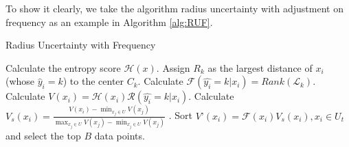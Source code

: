 To show it clearly, we take the algorithm radius uncertainty with adjustment on frequency as an example in Algorithm \ref{alg:RUF}.
\begin{algorithm}
\caption{Radius Uncertainty with Frequency}
\label{alg:RUF}
\begin{algorithmic}
\REPEAT 
\STATE Calculate the entropy score $\mathcal{H}(x)$.
\STATE Assign $R_k$ as the largest distance of $x_i$ (whose $\hat{y}_i = k$) to the center $C_k$.
\STATE Calculate $\mathcal{F}(\hat{y_i} = k|x_i) = Rank(\mathcal{L}_k)$.
\STATE Calculate $V(x_i) = {\mathcal{H}(x_i)}{\mathcal{R}(\hat{y_i}=k|x_i)}$.
\STATE  Calculate $V_s(x_i) = \frac{V(x_i)-\min_{x_j\in U}V(x_j)}{\max_{x_j\in U}V(x_j)-\min_{x_j\in U}V(x_j)}$ .
\STATE Sort $V’(x_i) = \mathcal{F}(x_i) V_s(x_i), x_i \in U_t$ and select the top $B$ data points.
\end{algorithmic}
\end{algorithm}
